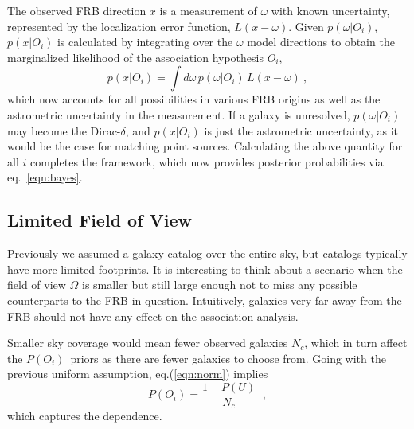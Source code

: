 \documentclass[twocolumn,linenumbers]{aastex63}
\newcommand{\mNc}{N_c} %
\newcommand{\Nc}{$\mNc$}
\newcommand{\mpoffset}{p(\omega|O_i)}  %
\newcommand{\poffset}{$\mpoffset$}
\newcommand{\mPOi}{P(O_i)}  %
\newcommand{\POi}{$\mPOi$}
\newcommand{\mpxOi}{p(x|O_i)}  %
\begin{document}
The observed FRB direction $x$ is a measurement of $\omega$ with known uncertainty, represented by the localization error function, $L(x-\omega)$. 
Given \poffset,  $\mpxOi$ is calculated by integrating over the $\omega$ model directions to obtain the marginalized likelihood of the association hypothesis $O_i$, 
\begin{equation}
\mpxOi = \int\!\!d\omega\, \mpoffset \, L(x-\omega) \ ,
\label{eqn:pxO}
\end{equation}
which now accounts for all possibilities in various FRB origins as well as the astrometric uncertainty in the measurement.
If a galaxy is unresolved, $p(\omega|O_i)$ may become the Dirac-$\delta$, and $\mpxOi$ is just the astrometric uncertainty, as it would be the case for matching point sources.
%
Calculating the above quantity for all $i$ 
completes the framework, which now provides posterior probabilities via
eq.~\ref{eqn:bayes}.


\subsection{Limited Field of View}
\label{sec:limited_field_of_view}

Previously we assumed a galaxy catalog over the entire sky, but catalogs typically have more limited footprints.
It is interesting to think about a scenario when the field of view $\Omega$ is smaller but still large enough not to miss any possible counterparts to the FRB in question.
Intuitively, galaxies very far away from the FRB should not have any effect on the association analysis.

Smaller sky coverage would mean fewer observed galaxies \Nc, which in turn affect the \POi\ priors as there are fewer galaxies to choose from. Going with the previous uniform assumption, eq.(\ref{eqn:norm}) implies
\begin{equation}
    \mPOi = \frac{1-P(U)}{\mNc} \;\; ,
\label{eqn:equalPO}
\end{equation}
which captures the dependence.
\end{document}
